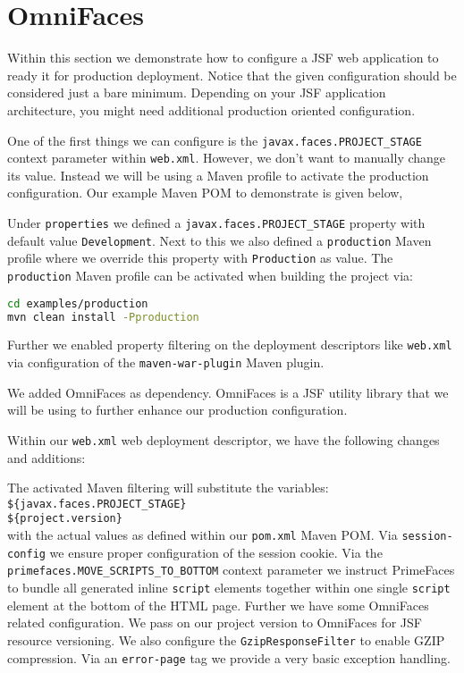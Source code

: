 \section{OmniFaces}
Within this section we demonstrate how to configure a JSF web application to ready it for production deployment.
Notice that the given configuration should be considered just a bare minimum.
Depending on your JSF application architecture, you might need additional production oriented configuration.

One of the first things we can configure is the \texttt{javax.\allowbreak faces.PROJECT\_STAGE} context parameter within \texttt{web.xml}.
However, we don't want to manually change its value.
Instead we will be using a Maven profile to activate the production configuration.
Our example Maven POM to demonstrate is given below,

Under \texttt{properties} we defined a \texttt{javax.\allowbreak faces.PROJECT\_STAGE} property with default value \texttt{Development}.
Next to this we also defined a \texttt{production} Maven profile where we override this property with \texttt{Production} as value.
The \texttt{production} Maven profile can be activated when building the project via:
\begin{lstlisting}[language=bash]
cd examples/production
mvn clean install -Pproduction
\end{lstlisting}
Further we enabled property filtering on the deployment descriptors like \texttt{web.xml} via configuration of the \texttt{maven\allowbreak-war\allowbreak-plugin} Maven plugin.

We added OmniFaces \cite{omnifaces} as dependency.
OmniFaces is a JSF utility library that we will be using to further enhance our production configuration.

Within our \texttt{web.xml} web deployment descriptor, we have the following changes and additions:

The activated Maven filtering will substitute the variables:\\
\indent \texttt{\$\{javax.faces.PROJECT\_STAGE\}}\\
\indent \texttt{\$\{project.version\}}\\
with the actual values as defined within our \texttt{pom.xml} Maven POM.
Via \texttt{session-config} we ensure proper configuration of the session cookie.
Via the \texttt{primefaces.MOVE\_SCRIPTS\allowbreak \_TO\_BOTTOM} context parameter we instruct PrimeFaces to bundle all generated inline \texttt{script} elements together within one single \texttt{script} element at the bottom of the HTML page.
Further we have some OmniFaces related configuration.
We pass on our project version to OmniFaces for JSF resource versioning.
We also configure the \texttt{GzipResponseFilter} to enable GZIP compression.
Via an \texttt{error-page} tag we provide a very basic exception handling.

